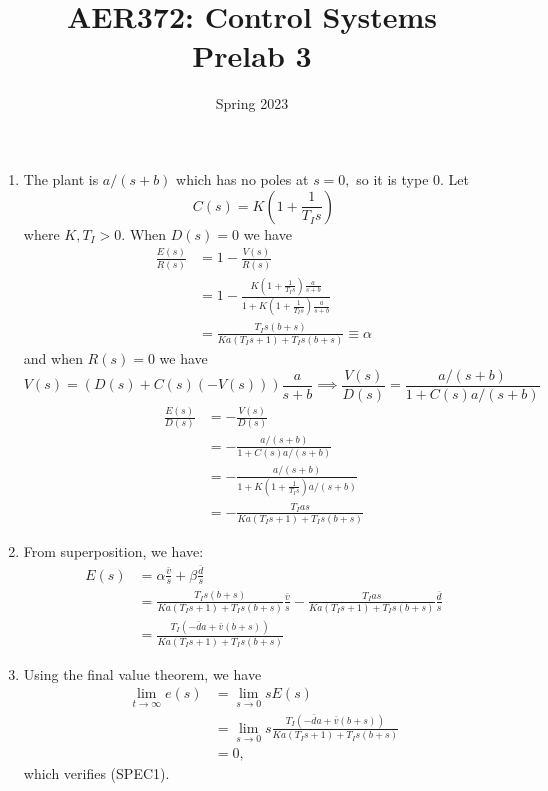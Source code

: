 \documentclass{article}
\title{AER372: Control Systems  \\ Prelab 3}
\author{}
\date{Spring 2023}
\numberwithin{equation}{section}
\begin{document}
\maketitle
\begin{enumerate}[label=(\alph*)]
    \item The plant is $a/(s+b)$ which has no poles at $s=0,$ so it is type 0. Let 
    \begin{equation}
        C(s) = K\left(1 + \frac{1}{T_Is}\right)
    \end{equation}
    where $K,T_I>0.$ When $D(s)=0$ we have 
    \begin{align}
        \frac{E(s)}{R(s)} &= 1 - \frac{V(s)}{R(s)} \\ 
        &= 1 - \frac{K\left(1 + \frac{1}{T_Is}\right)\frac{a}{s+b}}{1 + K\left(1 + \frac{1}{T_Is}\right)\frac{a}{s+b}} \\ 
        &= \frac{T_{I} s (b + s)}{K a (T_{I} s + 1) + T_{I} s (b + s)} \equiv \alpha
    \end{align}
    and when $R(s)=0$ we have 
    \begin{equation}
        V(s) = \left(D(s) + C(s)(-V(s))\right)\frac{a}{s+b} \implies \frac{V(s)}{D(s)} = \frac{a/(s+b)}{1+C(s)a/(s+b)}
    \end{equation}
    \begin{align}
        \frac{E(s)}{D(s)} &= - \frac{V(s)}{D(s)} \\ 
        &= -\frac{a/(s+b)}{1+C(s)a/(s+b)} \\ 
        &= -\frac{a/(s+b)}{1+K\left(1 + \frac{1}{T_Is}\right)a/(s+b)} \\ 
        &= - \frac{T_{I} a s}{K a (T_{I} s + 1) + T_{I} s (b + s)}
    \end{align}
    \item From superposition, we have:
    \begin{align}
        E(s) &= \alpha \frac{\bar{v}}{s} + \beta \frac{\bar{d}}{s} \\ 
        &= \frac{T_{I} s (b + s)}{K a (T_{I} s + 1) + T_{I} s (b + s)}  \frac{\bar{v}}{s} - \frac{T_{I} a s}{K a (T_{I} s + 1) + T_{I} s (b + s)}  \frac{\bar{d}}{s} \\ 
        &= \frac{T_{I} (- \bar{d} a + \bar{v} (b + s))}{K a (T_{I} s + 1) + T_{I} s (b + s)}
    \end{align}
    \item Using the final value theorem, we have 
    \begin{align}
        \lim_{t\to \infty}e(s) &= \lim_{s\to 0}sE(s) \\ 
        &= \lim_{s\to 0}s\frac{T_{I} (-\bar{d} a + \bar{v} (b + s))}{K a (T_{I} s + 1) + T_{I} s (b + s)} \\ 
        &= 0,
    \end{align}
    which verifies (SPEC1).
\end{enumerate}
\end{document}
